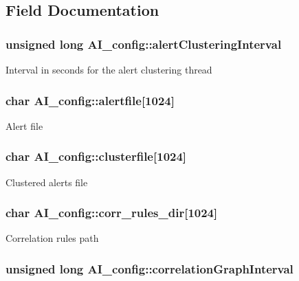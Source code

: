 \subsection{Field Documentation}
\hypertarget{structAI__config_a7d0d098b8263aa3d8415b11d1ec7f93d}{
\subsubsection[{alertClusteringInterval}]{\setlength{\rightskip}{0pt plus 5cm}unsigned long {\bf AI\_\-config::alertClusteringInterval}}}
\label{structAI__config_a7d0d098b8263aa3d8415b11d1ec7f93d}
Interval in seconds for the alert clustering thread \hypertarget{structAI__config_a2efa9590d7eea6dce8b5dd9aa76ed8ca}{
\subsubsection[{alertfile}]{\setlength{\rightskip}{0pt plus 5cm}char {\bf AI\_\-config::alertfile}\mbox{[}1024\mbox{]}}}
\label{structAI__config_a2efa9590d7eea6dce8b5dd9aa76ed8ca}
Alert file \hypertarget{structAI__config_a6da02a3f7116fd3810a41b738e8883a3}{
\subsubsection[{clusterfile}]{\setlength{\rightskip}{0pt plus 5cm}char {\bf AI\_\-config::clusterfile}\mbox{[}1024\mbox{]}}}
\label{structAI__config_a6da02a3f7116fd3810a41b738e8883a3}
Clustered alerts file \hypertarget{structAI__config_ab7ea93bbe72b85c4019b4f5656ad62fc}{
\subsubsection[{corr\_\-rules\_\-dir}]{\setlength{\rightskip}{0pt plus 5cm}char {\bf AI\_\-config::corr\_\-rules\_\-dir}\mbox{[}1024\mbox{]}}}
\label{structAI__config_ab7ea93bbe72b85c4019b4f5656ad62fc}
Correlation rules path \hypertarget{structAI__config_aa736375e57a59936e2e782b7cd200e41}{
\subsubsection[{correlationGraphInterval}]{\setlength{\rightskip}{0pt plus 5cm}unsigned long {\bf AI\_\-config::correlationGraphInterval}}}
